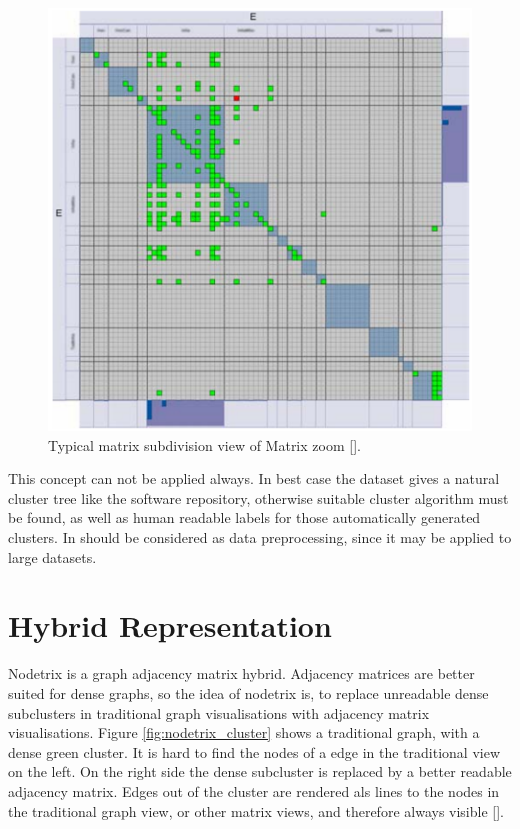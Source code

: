 \begin{figure}[h]
\centering
\includegraphics[width=\textwidth/2]{images/matrixzoom_cluster}
\caption{Typical matrix subdivision view of Matrix zoom [\cite{ham2005phd}]. \label{fig:matrixzoom_cluster}}
\end{figure}

This concept can not be applied always. In best case the dataset gives a natural cluster tree like the software repository, otherwise suitable cluster algorithm must be found, as well as human readable labels for those automatically generated clusters. In should be considered as data preprocessing, since it may be applied to large datasets.













\section{Hybrid Representation}
Nodetrix is a graph adjacency matrix hybrid. Adjacency matrices are better suited for dense graphs, so the idea of nodetrix is, to replace unreadable dense subclusters in traditional graph visualisations with adjacency matrix visualisations. Figure \ref{fig:nodetrix_cluster} shows a traditional graph, with a dense green cluster. It is hard to find the nodes of a edge in the traditional view on the left. On the right side the dense subcluster is replaced by a better readable  adjacency matrix. Edges out of the cluster are rendered als lines to the nodes in the traditional graph view, or other matrix views, and therefore always visible [\cite{henry-nodetrix-2007}].



